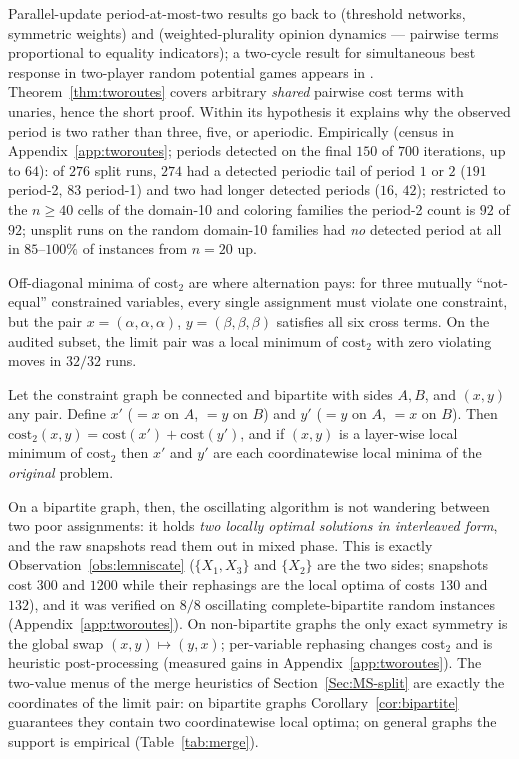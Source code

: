 Parallel-update period-at-most-two results go back to
\citet{GolesOlivos80} (threshold networks, symmetric weights) and
\citet{PoljakSura83} (weighted-plurality opinion dynamics --- pairwise
terms proportional to equality indicators); a two-cycle result for
simultaneous best response in two-player random potential games appears
in \citet{AshkenaziGolan25}.  Theorem~\ref{thm:tworoutes} covers
arbitrary \emph{shared} pairwise cost terms with unaries, hence the short
proof.  Within its hypothesis it explains why the observed period is two
rather than three, five, or aperiodic.  Empirically (census in
Appendix~\ref{app:tworoutes}; periods detected on the final $150$ of
$700$ iterations, up to $64$): of $276$ split runs, $274$ had a detected
periodic tail of period $1$ or $2$ ($191$ period-2, $83$ period-1) and
two had longer detected periods ($16$, $42$); restricted to the
$n \ge 40$ cells of the domain-10 and coloring families the period-2
count is $92$ of $92$; unsplit runs on the random domain-10 families had
\emph{no} detected period at all in $85$--$100\%$ of instances from
$n{=}20$ up.

Off-diagonal minima of $\mathrm{cost}_2$ are where alternation pays: for
three mutually ``not-equal'' constrained variables, every single
assignment must violate one constraint, but the pair
$x = (\alpha,\alpha,\alpha)$, $y = (\beta,\beta,\beta)$ satisfies all six
cross terms.  On the audited subset, the limit pair was a local minimum
of $\mathrm{cost}_2$ with zero violating moves in $32/32$ runs.

\begin{corollary}\label{cor:bipartite}
Let the constraint graph be connected and bipartite with sides $A, B$,
and $(x,y)$ any pair.  Define $x'$ ($=x$ on $A$, $=y$ on $B$) and $y'$
($=y$ on $A$, $=x$ on $B$).  Then
$\mathrm{cost}_2(x, y) = \mathrm{cost}(x') + \mathrm{cost}(y')$, and if
$(x,y)$ is a layer-wise local minimum of $\mathrm{cost}_2$ then $x'$ and
$y'$ are each coordinatewise local minima of the \emph{original} problem.
\end{corollary}

On a bipartite graph, then, the oscillating algorithm is not wandering
between two poor assignments: it holds \emph{two locally optimal
solutions in interleaved form}, and the raw snapshots read them out in
mixed phase.  This is exactly Observation~\ref{obs:lemniscate}
($\{X_1, X_3\}$ and $\{X_2\}$ are the two sides; snapshots cost $300$ and
$1200$ while their rephasings are the local optima of costs $130$ and
$132$), and it was verified on $8/8$ oscillating complete-bipartite
random instances (Appendix~\ref{app:tworoutes}).  On non-bipartite graphs
the only exact symmetry is the global swap $(x,y)\mapsto(y,x)$;
per-variable rephasing changes $\mathrm{cost}_2$ and is heuristic
post-processing (measured gains in Appendix~\ref{app:tworoutes}).  The
two-value menus of the merge heuristics of Section~\ref{Sec:MS-split} are
exactly the coordinates of the limit pair: on bipartite graphs
Corollary~\ref{cor:bipartite} guarantees they contain two coordinatewise
local optima; on general graphs the support is empirical
(Table~\ref{tab:merge}).

